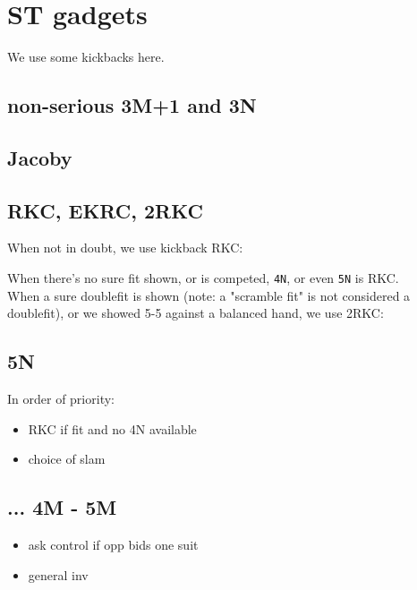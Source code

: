 \section{ST gadgets}

We use some kickbacks here.

\subsection{non-serious 3M+1 and 3N}


\subsection{Jacoby}


\subsection{RKC, EKRC, 2RKC}

When not in doubt, we use kickback RKC:


When there's no sure fit shown, or is competed, \texttt{4N}, or even \texttt{5N} is RKC. \\
When a sure doublefit is shown (note: a "scramble fit" is not considered a doublefit), or we showed 5-5 against a balanced hand, we use 2RKC: 


\subsection{5N}

In order of priority:

\begin{itemize}
    \setlength\itemsep{0pt}
    \item RKC if fit and no 4N available
    \item choice of slam
\end{itemize}

\subsection{... 4M - 5M}

\begin{itemize}
    \setlength\itemsep{0pt}
    \item ask control if opp bids one suit
    \item general inv
\end{itemize}